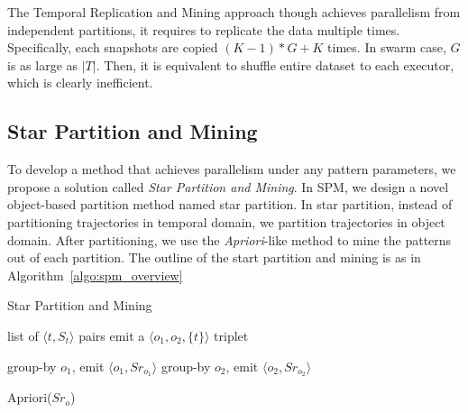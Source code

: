 The Temporal Replication and Mining approach though achieves parallelism from independent
partitions, it requires to replicate the data multiple times. 
Specifically, each snapshots are copied $(K-1)*G+K$ times. In swarm
case, $G$ is as large as $|T|$. Then, it is equivalent to shuffle entire dataset 
to each executor, which is clearly inefficient.


\subsection{Star Partition and Mining}
To develop a method that achieves parallelism under any pattern parameters, 
we propose a solution called \emph{Star Partition and Mining}. In SPM,
we design a novel object-based partition method named star partition. In star partition,
instead of partitioning trajectories in temporal domain, we partition trajectories 
in object domain. After partitioning, we use the \emph{Apriori}-like 
method to mine the patterns out of each partition. 
The outline of the start partition and mining is as in Algorithm~\ref{algo:spm_overview}

\begin{algorithm}
\caption{Star Partition and Mining}
\label{algo:spm_overview}
\begin{algorithmic}
\Require list of $\langle t, S_t \rangle$ pairs
		\State emit a $\langle o_1, o_2, \{t\}\rangle$ triplet
	\EndFor
\EndFor

	\State group-by $o_1$, emit $\langle o_1, Sr_{o_1} \rangle$ 
	\State group-by $o_2$, emit $\langle o_2, Sr_{o_2} \rangle$
\EndFor

\State Apriori($Sr_o$)
\EndFor

\end{algorithmic}
\end{algorithm}

